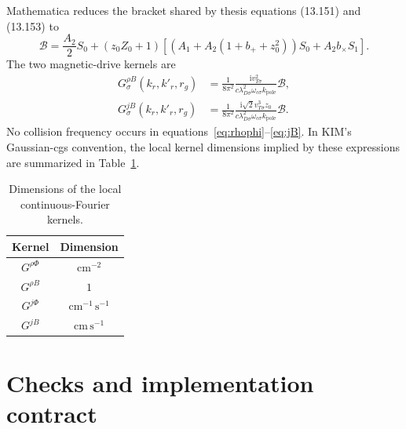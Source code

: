 \documentclass[11pt]{article}
\newcommand{\ii}{\mathrm{i}}
\newcommand{\vth}{v_{T\sigma}}
\newcommand{\oc}{\omega_{c\sigma}}
\newcommand{\ld}{\lambda_{D\sigma}}
\begin{document}
Mathematica reduces the bracket shared by thesis equations (13.151) and
(13.153) to
\begin{equation}
 \mathcal{B}=\frac{A_2}{2}S_0
 +(z_0Z_0+1)\left[
   \left(A_1+A_2(1+b_++z_0^2)\right)S_0+A_2b_\times S_1
 \right].
\end{equation}
The two magnetic-drive kernels are
\begin{align}
 G^{\rho B}_\sigma(k_r,k'_r,r_g)
 &=\frac{1}{8\pi^2}
   \frac{\ii\vth^2}{c\ld^2\oc k_{\mathrm{pole}}}\mathcal{B},\label{eq:rhoB}\\
 G^{jB}_\sigma(k_r,k'_r,r_g)
 &=\frac{1}{8\pi^2}
   \frac{\ii\sqrt{2}\vth^3z_0}
        {c\ld^2\oc k_{\mathrm{pole}}}\mathcal{B}.\label{eq:jB}
\end{align}
No collision frequency occurs in equations~\eqref{eq:rhophi}--\eqref{eq:jB}.
In KIM's Gaussian-cgs convention, the local kernel dimensions implied by these
expressions are summarized in Table~\ref{tab:dimensions}.

\begin{table}[ht]
 \centering
 \caption{Dimensions of the local continuous-Fourier kernels.}
 \label{tab:dimensions}
 \begin{tabular}{@{}cc@{}}
  \toprule
  Kernel & Dimension \\
  \midrule
  $G^{\rho\Phi}$ & $\mathrm{cm}^{-2}$ \\
  $G^{\rho B}$ & $1$ \\
  $G^{j\Phi}$ & $\mathrm{cm}^{-1}\,\mathrm{s}^{-1}$ \\
  $G^{jB}$ & $\mathrm{cm}\,\mathrm{s}^{-1}$ \\
  \bottomrule
 \end{tabular}
\end{table}

\section{Checks and implementation contract}
\end{document}
